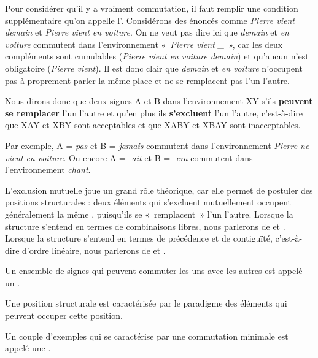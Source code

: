 Pour considérer qu’il y a vraiment commutation, il faut remplir une condition supplémentaire qu’on appelle l’. Considérons des énoncés comme \textit{Pierre vient demain} et \textit{Pierre vient en voiture}. On ne veut pas dire ici que \textit{demain} et \textit{en voiture} commutent dans l’environnement «~\textit{Pierre vient {\longrule}\_}~», car les deux compléments sont cumulables (\textit{Pierre vient en voiture demain}) et qu’aucun n’est obligatoire (\textit{Pierre vient}). Il est donc clair que \textit{demain} et \textit{en voiture} n’occupent pas à proprement parler la même place et ne se remplacent pas l’un l’autre.

\begin{styleLivreImportant}
Nous dirons donc que deux signes A et B  dans l’environnement X{\longrule}Y s’ils \textbf{peuvent se remplacer} l’un l’autre et qu’en plus ils \textbf{s’excluent} l’un l’autre, c’est-à-dire que XAY et XBY sont acceptables et que XABY et XBAY sont inacceptables.
\end{styleLivreImportant}

Par exemple, A = \textit{pas} et B = \textit{jamais} commutent dans l’environnement \textit{Pierre ne vient {\longrule}} \textit{en voiture}. Ou encore A = \textit{{}-ait} et B = \textit{{}-era} commutent dans l’environnement \textit{chant{\longrule}}.

L’exclusion mutuelle joue un grand rôle théorique, car elle permet de postuler des positions structurales : deux éléments qui s’excluent mutuellement occupent généralement la même , puisqu’ils se «~remplacent~» l’un l’autre. Lorsque la structure s’entend en termes de combinaisons libres, nous parlerons de  et . Lorsque la structure s’entend en termes de précédence et de contiguïté, c’est-à-dire d’ordre linéaire, nous parlerons de  et .

\begin{styleLivreImportant}
Un ensemble de signes qui peuvent commuter les uns avec les autres est appelé un .
\end{styleLivreImportant}

Une position structurale est caractérisée par le paradigme des éléments qui peuvent occuper cette position.

\begin{styleLivreImportant}
Un couple d’exemples qui se caractérise par une commutation minimale est appelé une .
\end{styleLivreImportant}

